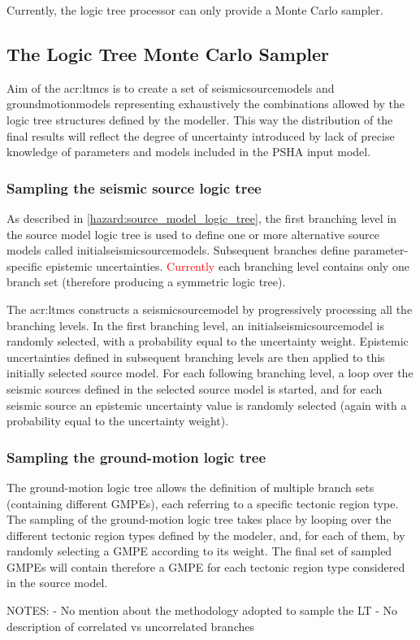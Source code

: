 Currently, the logic tree processor can only provide a Monte 
Carlo sampler.
%
\subsection{The Logic Tree Monte Carlo Sampler}
Aim of the \gls{acr:ltmcs} is to create a set of \glspl{seismicsourcemodel} 
and \glspl{groundmotionmodel} representing exhaustively the combinations 
allowed by the logic tree structures defined by the modeller.
% 
This way the distribution of the final results will reflect 
the degree of uncertainty introduced by lack of precise knowledge 
of parameters and models included in the PSHA input model.
%
\subsubsection{Sampling the seismic source logic tree}
As described in \ref{hazard:source_model_logic_tree}, the first branching 
level in the source model logic tree is used to define one or more 
alternative source models called \glspl{initialseismicsourcemodel}. 
%
Subsequent branches define parameter-specific epistemic uncertainties. 
\textcolor{red}{Currently} each branching level contains only one 
branch set (therefore producing a symmetric logic tree). 

The \gls{acr:ltmcs} constructs a \gls{seismicsourcemodel} by progressively
processing all the branching levels. In the first branching level, an 
\gls{initialseismicsourcemodel} is randomly selected, with a probability 
equal to the uncertainty 
weight. 
%
Epistemic uncertainties defined in subsequent branching levels are then 
applied to this initially selected source model. For each following 
branching level, a loop over the seismic sources defined in the selected
source model is started, and for each seismic source an epistemic 
uncertainty value is randomly selected (again with a probability equal to 
the uncertainty weight).
%
\subsubsection{Sampling the ground-motion logic tree}
The ground-motion logic tree allows the definition of multiple branch sets (containing different GMPEs), each referring to a specific tectonic region type. The sampling of the ground-motion logic tree takes place by looping over the different tectonic region types defined by the modeler, and, for each of them, by randomly selecting a GMPE according to its weight. The final set of sampled GMPEs will contain therefore a GMPE for each tectonic region type considered in the source model.

\dotfill \newline
NOTES:
- No mention about the methodology adopted to sample the LT
- No description of correlated vs uncorrelated branches
\hfill \clearpage

